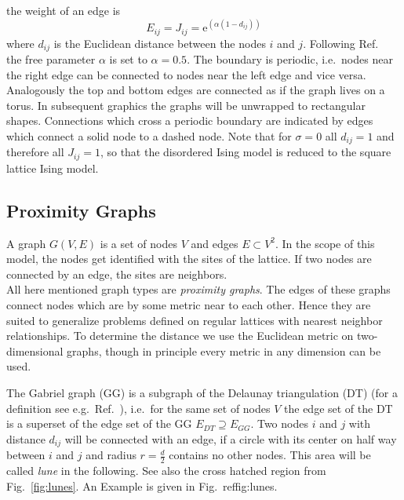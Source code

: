 the weight of an edge is
\begin{equation}
    E_{ij} = J_{ij} = \mathrm{e}^{(\alpha (1-d_{ij}))}
    \label{eq:coupling}
\end{equation}
where \(d_{ij}\) is the Euclidean
distance between the nodes \(i\) and \(j\). Following Ref.\ \cite{Lima2000}
the free parameter \(\alpha\) is set to \(\alpha = 0.5\).
The boundary is periodic, i.e.\ nodes near the right edge can be
connected to nodes near the left edge and vice versa. Analogously the
top and bottom edges are connected as if the graph lives on a torus.
In subsequent graphics the graphs will be unwrapped to rectangular
shapes. Connections which cross a periodic boundary are indicated
by edges which connect a solid node to a dashed node.
Note that for \(\sigma = 0\) all \(d_{ij} = 1\) and therefore all
\(J_{ij} = 1\), so that the disordered Ising model is reduced to the
square lattice Ising model.

\subsection{Proximity Graphs}
\label{ssec:graphtypes}
    A graph \(G(V,E)\) is a set of nodes \(V\) and edges \(E \subset V^{2}\).
    In the scope of this model, the nodes get identified with the sites of the
    lattice. If two nodes are connected by an edge, the sites are neighbors.\\
    All here mentioned graph types are \emph{proximity graphs}.
    The edges of these graphs connect nodes which are by some metric near
    to each other.
    Hence they are suited to generalize problems defined on regular
    lattices with nearest neighbor relationships.
    To determine the distance we use the Euclidean
    metric on two-dimensional graphs, though in principle every metric in any
    dimension can be used.

        The Gabriel graph (GG) \cite{Gabriel1969}
        is a subgraph of the Delaunay triangulation (DT) (for a definition
        see e.g.\ Ref.\ \cite{Katajainen}), i.e.\ for the same set of nodes
        \(V\) the edge set of the DT is a superset of the edge set of the
        GG \(E_{DT} \supseteq E_{GG}\). Two nodes \(i\) and \(j\) with distance
        \(d_{ij}\) will be connected with an edge, if a circle with its
        center on half way between \(i\) and \(j\) and radius
        \(r = \frac d 2\) contains no other nodes. This area will be
        called \emph{lune} in the following. See also the cross hatched region
        from Fig.\ \ref{fig:lunes}. An Example is
        given in Fig.\ ref{fig:lunes}.

